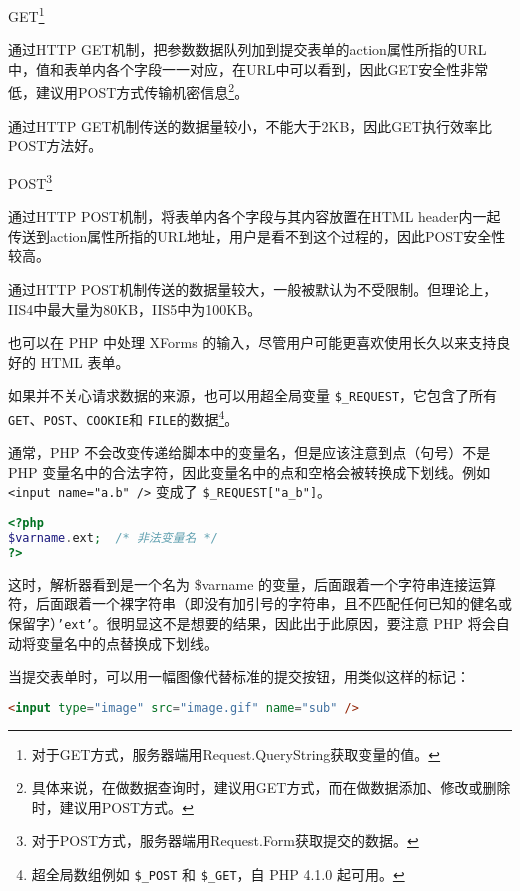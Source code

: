 \begin{compactitem}
\item GET\footnote{对于GET方式，服务器端用Request.QueryString获取变量的值。}

通过HTTP GET机制，把参数数据队列加到提交表单的action属性所指的URL中，值和表单内各个字段一一对应，在URL中可以看到，因此GET安全性非常低，建议用POST方式传输机密信息\footnote{具体来说，在做数据查询时，建议用GET方式，而在做数据添加、修改或删除时，建议用POST方式。}。

通过HTTP GET机制传送的数据量较小，不能大于2KB，因此GET执行效率比POST方法好。

\item POST\footnote{对于POST方式，服务器端用Request.Form获取提交的数据。}

通过HTTP POST机制，将表单内各个字段与其内容放置在HTML header内一起传送到action属性所指的URL地址，用户是看不到这个过程的，因此POST安全性较高。

通过HTTP POST机制传送的数据量较大，一般被默认为不受限制。但理论上，IIS4中最大量为80KB，IIS5中为100KB。
\end{compactitem}

也可以在 PHP 中处理 XForms 的输入，尽管用户可能更喜欢使用长久以来支持良好的 HTML 表单。


如果并不关心请求数据的来源，也可以用超全局变量 \texttt{\$\_REQUEST}，它包含了所有 \texttt{GET}、\texttt{POST}、\texttt{COOKIE}和 \texttt{FILE}的数据\footnote{超全局数组例如 \texttt{\$\_POST} 和 \texttt{\$\_GET}，自 PHP 4.1.0 起可用。}。

通常，PHP 不会改变传递给脚本中的变量名，但是应该注意到点（句号）不是 PHP 变量名中的合法字符，因此变量名中的点和空格会被转换成下划线。例如 \texttt{<input name="a.b" />} 变成了 \texttt{\$\_REQUEST["a\_b"]}。

\begin{lstlisting}[language=PHP]
<?php
$varname.ext;  /* 非法变量名 */
?>
\end{lstlisting}

这时，解析器看到是一个名为 \$varname 的变量，后面跟着一个字符串连接运算符，后面跟着一个裸字符串（即没有加引号的字符串，且不匹配任何已知的健名或保留字）\texttt{'ext'}。很明显这不是想要的结果，因此出于此原因，要注意 PHP 将会自动将变量名中的点替换成下划线。

当提交表单时，可以用一幅图像代替标准的提交按钮，用类似这样的标记：
\begin{lstlisting}[language=HTML]
<input type="image" src="image.gif" name="sub" />
\end{lstlisting}

